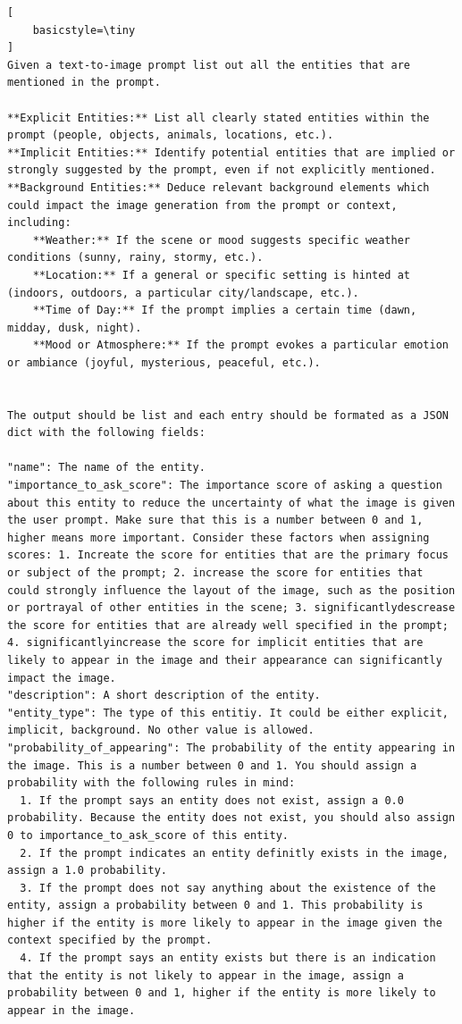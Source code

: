 \begin{lstlisting}[
    basicstyle=\tiny
]
Given a text-to-image prompt list out all the entities that are mentioned in the prompt. 

**Explicit Entities:** List all clearly stated entities within the prompt (people, objects, animals, locations, etc.).
**Implicit Entities:** Identify potential entities that are implied or strongly suggested by the prompt, even if not explicitly mentioned. 
**Background Entities:** Deduce relevant background elements which could impact the image generation from the prompt or context, including:
    **Weather:** If the scene or mood suggests specific weather conditions (sunny, rainy, stormy, etc.).
    **Location:** If a general or specific setting is hinted at (indoors, outdoors, a particular city/landscape, etc.).
    **Time of Day:** If the prompt implies a certain time (dawn, midday, dusk, night).
    **Mood or Atmosphere:** If the prompt evokes a particular emotion or ambiance (joyful, mysterious, peaceful, etc.).


The output should be list and each entry should be formated as a JSON dict with the following fields:

"name": The name of the entity.
"importance_to_ask_score": The importance score of asking a question about this entity to reduce the uncertainty of what the image is given the user prompt. Make sure that this is a number between 0 and 1, higher means more important. Consider these factors when assigning scores: 1. Increate the score for entities that are the primary focus or subject of the prompt; 2. increase the score for entities that could strongly influence the layout of the image, such as the position or portrayal of other entities in the scene; 3. significantlydescrease the score for entities that are already well specified in the prompt; 4. significantlyincrease the score for implicit entities that are likely to appear in the image and their appearance can significantly impact the image.
"description": A short description of the entity.
"entity_type": The type of this entitiy. It could be either explicit, implicit, background. No other value is allowed.
"probability_of_appearing": The probability of the entity appearing in the image. This is a number between 0 and 1. You should assign a probability with the following rules in mind:
  1. If the prompt says an entity does not exist, assign a 0.0 probability. Because the entity does not exist, you should also assign 0 to importance_to_ask_score of this entity.
  2. If the prompt indicates an entity definitly exists in the image, assign a 1.0 probability.
  3. If the prompt does not say anything about the existence of the entity, assign a probability between 0 and 1. This probability is higher if the entity is more likely to appear in the image given the context specified by the prompt.
  4. If the prompt says an entity exists but there is an indication that the entity is not likely to appear in the image, assign a probability between 0 and 1, higher if the entity is more likely to appear in the image.


\end{lstlisting}

